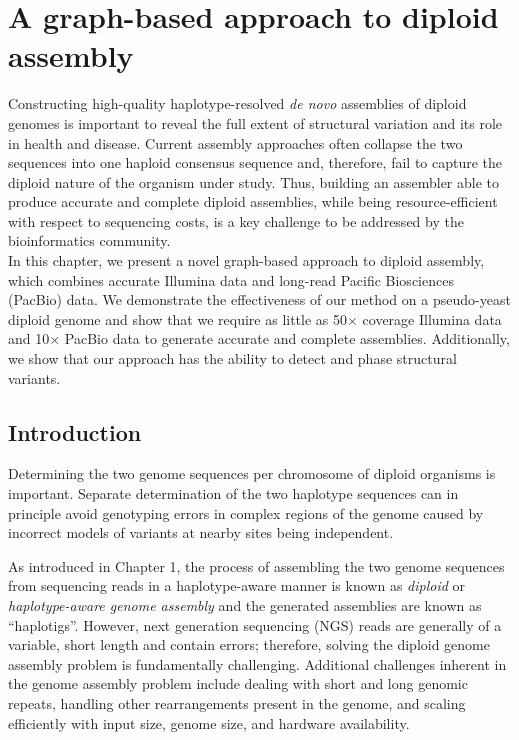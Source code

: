\chapter{A graph-based approach to diploid assembly}
Constructing high-quality haplotype-resolved \textit{de novo} assemblies of diploid genomes is important to reveal the full extent of structural variation and its role in health and disease.
Current assembly approaches often collapse the two sequences into one haploid consensus sequence and, therefore, fail to capture the diploid nature of the organism under study.
Thus, building an assembler able to produce accurate and complete diploid assemblies, while being resource-efficient with respect to sequencing costs, is a key challenge to be addressed by the bioinformatics community.\\

In this chapter, we present a novel graph-based approach to diploid assembly, which combines accurate Illumina data and long-read Pacific Biosciences (PacBio) data.
We demonstrate the effectiveness of our method on a pseudo-yeast diploid genome and show that we require as little as 50$\times$ coverage Illumina data and 10$\times$ PacBio data to generate accurate and complete assemblies.
Additionally, we show that our approach has the ability to detect and phase structural variants.\\


\section{Introduction}
Determining the two genome sequences per chromosome of diploid organisms is important.
Separate determination of the two haplotype sequences can in principle avoid genotyping errors in complex regions of the genome caused by incorrect models of variants at nearby sites being independent.

As introduced in Chapter 1, the process of assembling the two genome sequences from sequencing reads in a haplotype-aware manner is known as \textit{diploid} or \textit{haplotype-aware genome assembly} and the generated assemblies are known as ``haplotigs''.
However, next generation sequencing (NGS) reads are generally of a variable, short length and contain errors; therefore, solving the diploid genome assembly problem is fundamentally challenging.
Additional challenges inherent in the genome assembly problem include dealing with short and long genomic repeats, handling other rearrangements present in the genome, and scaling efficiently with input size, genome size, and hardware availability.

